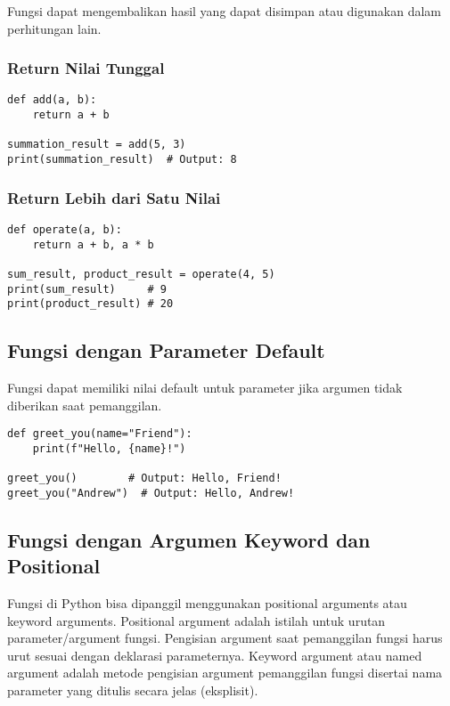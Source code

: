 Fungsi dapat mengembalikan hasil yang dapat disimpan atau digunakan dalam perhitungan lain.

\subsubsection{Return Nilai Tunggal}
\begin{lstlisting}[style=PythonStyle, caption={Kode Python: function_with_single_return.py}]
def add(a, b):
    return a + b

summation_result = add(5, 3)
print(summation_result)  # Output: 8
\end{lstlisting}

\subsubsection{Return Lebih dari Satu Nilai}
\begin{lstlisting}[style=PythonStyle, caption={Kode Python: function_with_multiple_return.py}]
def operate(a, b):
    return a + b, a * b

sum_result, product_result = operate(4, 5)
print(sum_result)     # 9
print(product_result) # 20
\end{lstlisting}

\subsection{Fungsi dengan Parameter Default}

Fungsi dapat memiliki nilai default untuk parameter jika argumen tidak diberikan saat pemanggilan.

\begin{lstlisting}[style=PythonStyle, caption={Kode Python: function_with_default_parameter.py}]
def greet_you(name="Friend"):
    print(f"Hello, {name}!")

greet_you()        # Output: Hello, Friend!
greet_you("Andrew")  # Output: Hello, Andrew!
\end{lstlisting}

\subsection{Fungsi dengan Argumen Keyword dan Positional}
Fungsi di Python bisa dipanggil menggunakan positional arguments atau keyword arguments. Positional argument adalah istilah untuk urutan parameter/argument fungsi. Pengisian argument saat pemanggilan fungsi harus urut sesuai dengan deklarasi parameternya. Keyword argument atau named argument adalah metode pengisian argument pemanggilan fungsi disertai nama parameter yang ditulis secara jelas (eksplisit).

